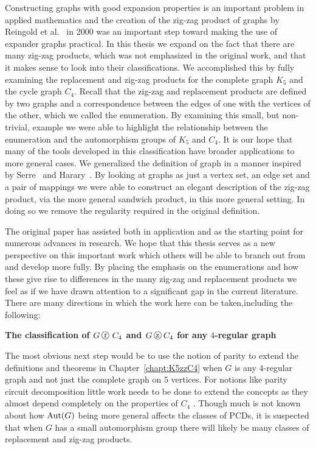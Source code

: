 Constructing graphs with good expansion properties is an important problem in
applied mathematics and the creation of the zig-zag product of graphs by Reingold {et al.}~\cite{Reingold:2002ys} in 2000 was an important step toward making the use of expander graphs practical. In this thesis we expand on the fact that there are many zig-zag products, which was not emphasized in the original work, and that it makes sense to look into their classifications. We accomplished this by fully examining the replacement and zig-zag products for the complete graph $K_5$ and the cycle graph $C_4$. Recall that the zig-zag and replacement products are defined by two graphs and a correspondence between the edges of one with the vertices of
the other, which we called the enumeration. By examining this small, but non-trivial, example we were able to highlight the relationship between the enumeration and the automorphism groups of $K_5$ and $C_4$. It is our hope that many of the tools developed in this classification have broader applications to more general cases.
We generalized the definition of graph in a manner inspired by Serre~\cite{Serre:1980} and Harary~\cite{Harary:1966}. By looking at graphs as just a vertex set, an edge set and a pair of mappings we were able to construct an elegant description of the zig-zag product, via the more general sandwich product, in this more general setting. In doing so we remove the regularity required in the original definition.

The original paper \cite{Reingold:2002ys} has assisted both in application and as the starting point for numerous advances in research. We hope that this thesis serves as a new perspective on this important work which others will be able to branch out from and develop more fully. By placing the emphasis on the enumerations and how these give rise to differences in the many
zig-zag and replacement products we feel as if we have drawn attention to a significant gap in the current literature. There are many directions in which the work here can be taken,including the following:

\vspace{2ex}
\noindent
{\bf The classification of $G \replacement C_4$ and $G \zigzag C_4$ for any $4$-regular graph}
\vspace{2ex}

The most obvious next step would be to use the notion of parity to extend the
definitions and theorems in Chapter~\ref{chapt:K5zzC4} when $G$ is any $4$-regular graph and not just the complete graph on $5$ vertices. For notions like parity circuit decomposition little work needs to be done to extend the concepts as they almost depend completely on the properties of $C_4$ . Though much is not known about how $\operatorname{\mathrm{Aut}}(G)$ being more general affects the classes of PCDs, it is suspected that when $G$ has a small automorphism group there will likely be many classes of
replacement and zig-zag products.

